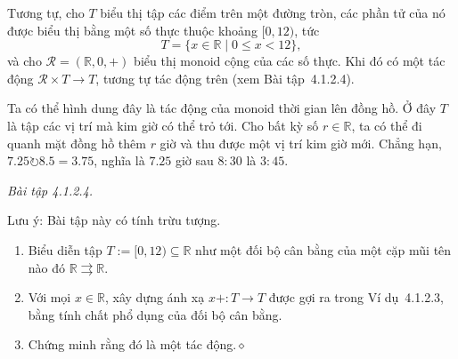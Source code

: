 Tương tự, cho $T$ biểu thị tập các điểm trên một đường tròn, các phần tử của nó được biểu thị bằng một số thực thuộc khoảng $[0,12)$, tức
\[
T=\{x\in\mathbb{R}\mid0\le x<12\},
\]
và cho $\mathcal{R}=(\mathbb{R},0,+)$ biểu thị monoid cộng của các số thực. Khi đó có một tác động $\mathcal{R}\times T\to T$, tương tự tác động trên (xem Bài tập~4.1.2.4).

Ta có thể hình dung đây là tác động của monoid thời gian lên đồng hồ. Ở đây $T$ là tập các vị trí mà kim giờ có thể trỏ tới. Cho bất kỳ số $r\in\mathbb{R}$, ta có thể đi quanh mặt đồng hồ thêm $r$ giờ và thu được một vị trí kim giờ mới. Chẳng hạn, $7.25\circlearrowright8.5=3.75$, nghĩa là $7.25$ giờ sau $8{:}30$ là $3{:}45$.

\noindent\textit{Bài tập 4.1.2.4.}\keepwithnext

Lưu ý: Bài tập này có tính trừu tượng.
\begin{enumerate}[label=\alph*.]
\item Biểu diễn tập $T:=[0,12)\subseteq\mathbb{R}$ như một đối bộ cân bằng của một cặp mũi tên nào đó $\mathbb{R}\rightrightarrows\mathbb{R}$.
\item Với mọi $x\in\mathbb{R}$, xây dựng ánh xạ $x+:T\to T$ được gợi ra trong Ví dụ~4.1.2.3, bằng tính chất phổ dụng của đối bộ cân bằng.
\item Chứng minh rằng đó là một tác động.\hfill$\diamond$
\end{enumerate}

